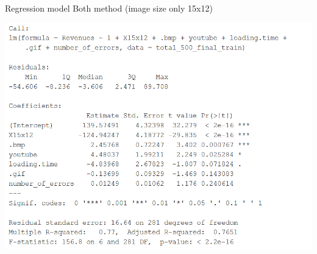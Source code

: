 \documentclass{book}
\begin{document}
\begin{table}[H]
\centering
\caption{Regression model Both method (image size only 15x12)}\label{d :r :6}
\begin{center}
\includegraphics[scale=0.8]{../R/photos/99_model6.PNG}  \\
\end{center}
\end{table}
\end{document}
